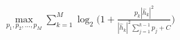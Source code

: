 \documentclass[preview]{standalone}
\begin{document}
\begin{align*}
\max_{p_1, p_2,...,p_M} \sum_{k=1}^{M} \log_2 \Bigg( 1 + \frac{p_k\left|{\hat{h}_k}\right|^2}{\left|{\hat{h}_k}\right|^2\sum_{j=1}^{k-1}p_j + C} \Bigg)
\end{align*}
\end{document}
